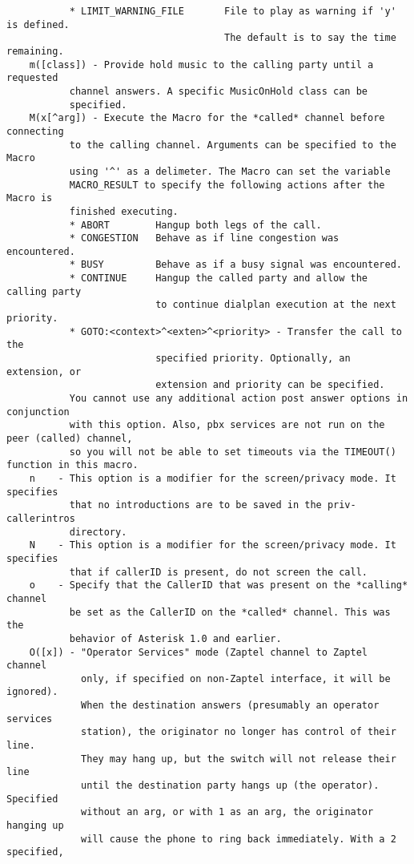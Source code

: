 \begin{verbatim}
           * LIMIT_WARNING_FILE       File to play as warning if 'y' is defined.
                                      The default is to say the time remaining.
    m([class]) - Provide hold music to the calling party until a requested
           channel answers. A specific MusicOnHold class can be
           specified.
    M(x[^arg]) - Execute the Macro for the *called* channel before connecting
           to the calling channel. Arguments can be specified to the Macro
           using '^' as a delimeter. The Macro can set the variable
           MACRO_RESULT to specify the following actions after the Macro is
           finished executing.
           * ABORT        Hangup both legs of the call.
           * CONGESTION   Behave as if line congestion was encountered.
           * BUSY         Behave as if a busy signal was encountered.
           * CONTINUE     Hangup the called party and allow the calling party
                          to continue dialplan execution at the next priority.
           * GOTO:<context>^<exten>^<priority> - Transfer the call to the
                          specified priority. Optionally, an extension, or
                          extension and priority can be specified.
           You cannot use any additional action post answer options in conjunction
           with this option. Also, pbx services are not run on the peer (called) channel,
           so you will not be able to set timeouts via the TIMEOUT() function in this macro.
    n    - This option is a modifier for the screen/privacy mode. It specifies
           that no introductions are to be saved in the priv-callerintros
           directory.
    N    - This option is a modifier for the screen/privacy mode. It specifies
           that if callerID is present, do not screen the call.
    o    - Specify that the CallerID that was present on the *calling* channel
           be set as the CallerID on the *called* channel. This was the
           behavior of Asterisk 1.0 and earlier.
    O([x]) - "Operator Services" mode (Zaptel channel to Zaptel channel
             only, if specified on non-Zaptel interface, it will be ignored).
             When the destination answers (presumably an operator services
             station), the originator no longer has control of their line.
             They may hang up, but the switch will not release their line
             until the destination party hangs up (the operator). Specified
             without an arg, or with 1 as an arg, the originator hanging up
             will cause the phone to ring back immediately. With a 2 specified,

\end{verbatim}
